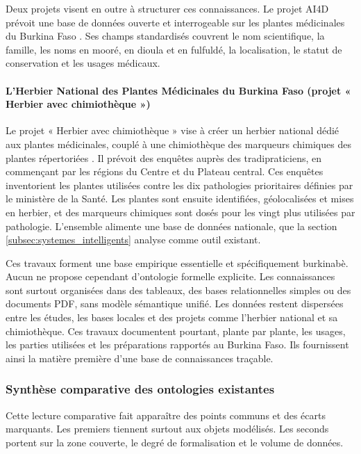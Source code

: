Deux projets visent en outre à structurer ces connaissances. Le projet AI4D prévoit une base de données ouverte et interrogeable sur les plantes médicinales du Burkina Faso \cite{ai4d2020}. Ses champs standardisés couvrent le nom scientifique, la famille, les noms en mooré, en dioula et en fulfuldé, la localisation, le statut de conservation et les usages médicaux.

\paragraph{L'Herbier National des Plantes Médicinales du Burkina Faso (projet « Herbier avec chimiothèque »)}

Le projet « Herbier avec chimiothèque » vise à créer un herbier national dédié aux plantes médicinales, couplé à une chimiothèque des marqueurs chimiques des plantes répertoriées \cite{burkinaherbiermed}. Il prévoit des enquêtes auprès des tradipraticiens, en commençant par les régions du Centre et du Plateau central. Ces enquêtes inventorient les plantes utilisées contre les dix pathologies prioritaires définies par le ministère de la Santé. Les plantes sont ensuite identifiées, géolocalisées et mises en herbier, et des marqueurs chimiques sont dosés pour les vingt plus utilisées par pathologie. L'ensemble alimente une base de données nationale, que la section \ref{subsec:systemes_intelligents} analyse comme outil existant.

Ces travaux forment une base empirique essentielle et spécifiquement burkinabè. Aucun ne propose cependant d'ontologie formelle explicite. Les connaissances sont surtout organisées dans des tableaux, des bases relationnelles simples ou des documents PDF, sans modèle sémantique unifié. Les données restent dispersées entre les études, les bases locales et des projets comme l'herbier national et sa chimiothèque. Ces travaux documentent pourtant, plante par plante, les usages, les parties utilisées et les préparations rapportés au Burkina Faso. Ils fournissent ainsi la matière première d'une base de connaissances traçable.

\subsubsection{Synthèse comparative des ontologies existantes}
\label{subsubsec:synthese_ontologies}

Cette lecture comparative fait apparaître des points communs et des écarts marquants. Les premiers tiennent surtout aux objets modélisés. Les seconds portent sur la zone couverte, le degré de formalisation et le volume de données.

